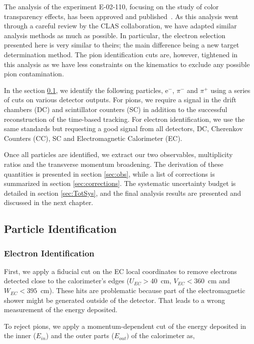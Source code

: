 The analysis of the experiment E-02-110, focusing on the study of color 
transparency effects, has been approved and published~\cite{ElFassi:2008}. As this 
analysis went through a careful review by the CLAS collaboration, we have adapted similar analysis methods as much as possible. In particular, the electron selection 
presented here is very similar to theirs; the main difference being a new 
target determination method. The pion identification cuts are, however, tightened
in this analysis as we have less constraints on the kinematics to exclude any possible pion contamination.

In the section \ref{sec:pid}, we identify the following particles, e$^-$, 
$\pi^-$ and $\pi^+$ using a series of cuts on various detector outputs. For pions, we require a signal in the drift chambers (DC) and scintillator counters (SC) in 
addition to the successful reconstruction of the time-based tracking. For electron 
identification, we use the same standards but requesting a good signal from 
all detectors, DC, Cherenkov Counters (CC), SC and Electromagnetic 
Calorimeter (EC).

Once all particles are identified, we extract our two observables, 
multiplicity ratios and the transverse momentum broadening. The derivation 
of these quantities is presented in section \ref{sec:obs}, while a list of 
corrections  is summarized in section \ref{sec:corrections}. The systematic 
uncertainty budget is detailed in section \ref{sec:TotSys}, and the final 
analysis results are presented and discussed in the next chapter.

\subsection{Particle Identification}
\label{sec:pid}

\subsubsection{Electron Identification}

First, we apply a fiducial cut on the EC local coordinates to remove electrons detected close to the calorimeter's edges ($U_{EC}>40$~cm, $V_{EC}<360$~cm and 
$W_{EC}<395$~cm). These hits are problematic because part of the electromagnetic shower might be generated outside of the detector. That leads to a wrong measurement of the energy deposited.

To reject pions, we apply a momentum-dependent cut of the energy deposited in the inner ($E_{in}$) and the outer parts ($E_{out})$ of the calorimeter as,

